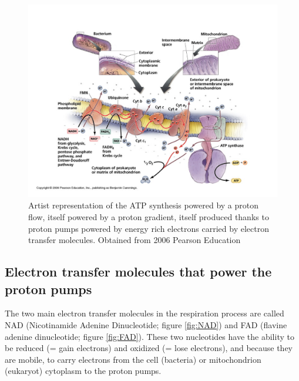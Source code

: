 \documentclass[]{book}
\theoremstyle{definition}
\theoremstyle{definition}
\theoremstyle{definition}
\theoremstyle{remark}
\begin{document}
\begin{figure}

{\centering \includegraphics[width=1\linewidth]{pictures/membrane_proton_pumps} 

}

\caption{Artist representation of the ATP synthesis powered by a proton flow, itself powered by a proton gradient, itself produced thanks to proton pumps powered by energy rich electrons carried by electron transfer molecules. Obtained from 2006 Pearson Education}\label{fig:protonpumps}
\end{figure}

\hypertarget{electron-transfer-molecules-that-power-the-proton-pumps}{\subsection{Electron
transfer molecules that power the proton
pumps}\label{electron-transfer-molecules-that-power-the-proton-pumps}}

The two main electron transfer molecules in the respiration process are
called NAD (Nicotinamide Adenine Dinucleotide; figure \ref{fig:NAD}) and
FAD (flavine adenine dinucleotide; figure \ref{fig:FAD}). These two
nucleotides have the ability to be reduced (= gain electrons) and
oxidized (= lose electrons), and because they are mobile, to carry
electrons from the cell (bacteria) or mitochondrion (eukaryot) cytoplasm
to the proton pumps.
\end{document}

